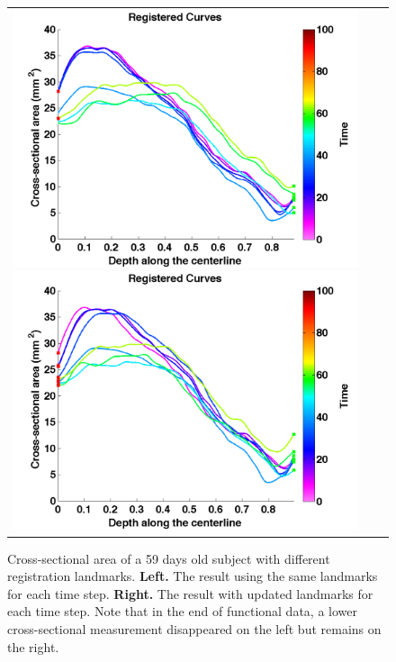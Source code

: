 \begin{figure}[tb]
  \begin{center}
    \begin{tabular}{ccc}
    \includegraphics[width=\figwidth] {fig/registered_1_updates_0.png}
    \includegraphics[width=\figwidth] {fig/registered_1_updates_1.png}
    \end{tabular}
    \caption{ \label{fig:landmark_updated} Cross-sectional area of a 59 days old subject with different registration landmarks. {\bf Left.} The result using the same landmarks for each time step. {\bf Right.} The result with updated landmarks for each time step. Note that in the end of functional data, a lower cross-sectional measurement disappeared on the left but remains on the right.
    }
  \end{center}
\end{figure}

